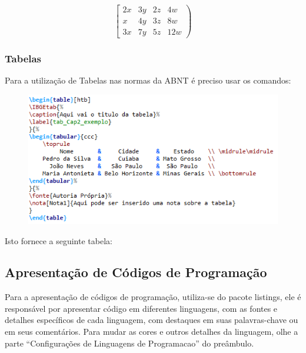 \[
\left[
\begin{array}{c|ccc}
2x & 3y & 2z & 4w  \\
x  & 4y & 3z & 8w  \\ \hline
3x & 7y & 5z & 12w
\end{array}
\right)
\]

\subsubsection{Tabelas}
Para a utilização de Tabelas nas normas da ABNT é preciso usar os comandos:

\begin{figure}[htb]
	\begin{center}
		\includegraphics[scale=1]{./Imagens/capitulo_2/code_4.png}
	\end{center}
\end{figure}

Isto fornece a seguinte tabela:

\begin{table}[htb]
\end{table}



\subsection{Apresentação de Códigos de Programação}
Para a apresentação de códigos de programação, utiliza-se do pacote listings, ele é responsável por apresentar código em diferentes linguagens, com as fontes e detalhes específicos de cada linguagem, com destaques em suas palavras-chave ou em seus comentários. Para mudar as cores e outros detalhes da linguagem, olhe a parte ``Configurações de Linguagens de Programacao'' do preâmbulo.

